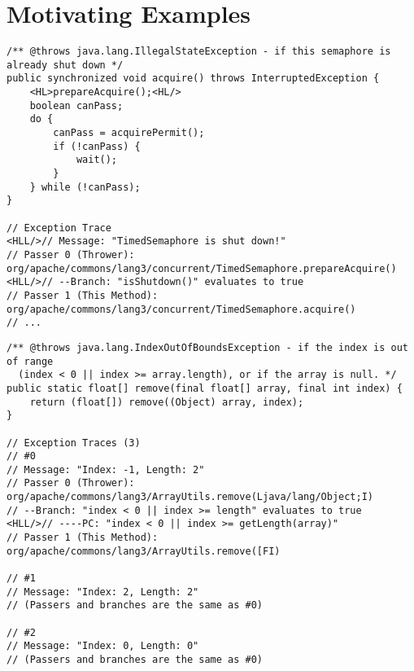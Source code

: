 \section{Motivating Examples}
\label{sec:examples}

\begin{lstlisting}[language=java-pretty]
/** @throws java.lang.IllegalStateException - if this semaphore is already shut down */
public synchronized void acquire() throws InterruptedException {
    <HL>prepareAcquire();<HL/>
    boolean canPass;
    do {
        canPass = acquirePermit();
        if (!canPass) {
            wait();
        }
    } while (!canPass);
}

// Exception Trace
<HLL/>// Message: "TimedSemaphore is shut down!"
// Passer 0 (Thrower): org/apache/commons/lang3/concurrent/TimedSemaphore.prepareAcquire()
<HLL/>// --Branch: "isShutdown()" evaluates to true
// Passer 1 (This Method): org/apache/commons/lang3/concurrent/TimedSemaphore.acquire()
// ...
\end{lstlisting}

\begin{lstlisting}[language=java-pretty]
/** @throws java.lang.IndexOutOfBoundsException - if the index is out of range
  (index < 0 || index >= array.length), or if the array is null. */
public static float[] remove(final float[] array, final int index) {
    return (float[]) remove((Object) array, index);
}

// Exception Traces (3)
// #0
// Message: "Index: -1, Length: 2"
// Passer 0 (Thrower): org/apache/commons/lang3/ArrayUtils.remove(Ljava/lang/Object;I)
// --Branch: "index < 0 || index >= length" evaluates to true
<HLL/>// ----PC: "index < 0 || index >= getLength(array)"
// Passer 1 (This Method): org/apache/commons/lang3/ArrayUtils.remove([FI)

// #1
// Message: "Index: 2, Length: 2"
// (Passers and branches are the same as #0)

// #2
// Message: "Index: 0, Length: 0"
// (Passers and branches are the same as #0)
\end{lstlisting}

